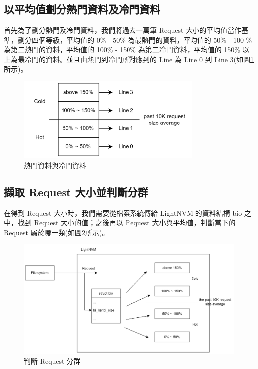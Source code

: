 \subsection{以平均值劃分熱門資料及冷門資料}\label{s3.2.1}
\indent
首先為了劃分熱門及冷門資料，我們將過去一萬筆 Request 大小的平均值當作基準，劃分四個等級，平均值的 0\% - 50\% 為最熱門的資料，平均值的 50\% - 100 \% 為第二熱門的資料，平均值的 100\% - 150\% 為第二冷門資料，平均值的 150\% 以上為最冷門的資料。並且由熱門到冷門所對應到的 Line 為 Line 0 到 Line 3(如圖\ref{f3.5}所示)。
\begin{figure}[H]
    \centering
    \includegraphics[width=0.8\textwidth]{picture/ch3/hot_cold.png}
    \caption{熱門資料與冷門資料}
    \label{f3.5}
\end{figure}

\subsection{擷取 Request 大小並判斷分群}\label{s3.2.2}
\indent
在得到 Request 大小時，我們需要從檔案系統傳給 LightNVM 的資料結構 bio 之中，找到 Request 大小的值；之後再以 Request 大小與平均值，判斷當下的 Request 屬於哪一類(如圖\ref{f3.6}所示)。
\begin{figure}[H]
    \centering
    \includegraphics[width=1\textwidth]{picture/ch3/get_rq_size_hot_cold.png}
    \caption{判斷 Request 分群}
    \label{f3.6}
\end{figure}


